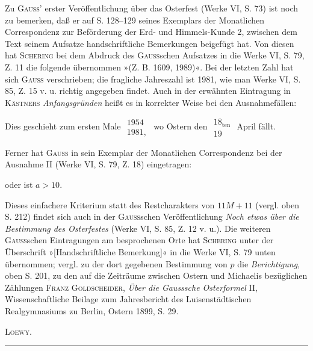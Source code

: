 Zu \textsc{Gauss}' erster Veröffentlichung über das Osterfest (Werke VI, S. 73) ist noch zu bemerken, daß er auf S. 128--129 seines Exemplars der Monatlichen Correspondenz zur Beförderung der Erd- und Himmels-Kunde 2, zwischen dem Text seinem Aufsatze handschriftliche Bemerkungen beigefügt hat. Von diesen hat \textsc{Schering} bei dem Abdruck des \textsc{Gauss}schen Aufsatzes in die Werke VI, S. 79, Z. 11 die folgende übernommen »(Z. B. 1609, 1989)«. Bei der letzten Zahl hat sich \textsc{Gauss} verschrieben; die fragliche Jahreszahl ist 1981, wie man Werke VI, S. 85, Z. 15 v. u. richtig angegeben findet. Auch in der erwähnten Eintragung in \textsc{Kästners} \textit{Anfangsgründen} heißt es in korrekter Weise bei den Ausnahmefällen:
\begin{center}\normalsize
Dies geschieht zum ersten Male $\begin{array}{r}1954\\1981,\end{array}$ wo Ostern den $\begin{array}{c}18_{\mathrm{ten}}\\19\end{array}$ April fällt.
\end{center}
\noindent\hspace*{\parindent}Ferner hat \textsc{Gauss} in sein Exemplar der Monatlichen Correspondenz bei der Ausnahme II (Werke VI, S. 79, Z. 18) eingetragen:
\begin{center}\normalsize
oder ist $a>10$.
\end{center}
\noindent Dieses einfachere Kriterium statt des Restcharakters von $11M+11$ (vergl. oben S. 212) findet sich auch in der \textsc{Gauss}schen Veröffentlichung \textit{Noch etwas über die Bestimmung des Osterfestes} (Werke VI, S. 85, Z. 12 v. u.). Die weiteren \textsc{Gauss}schen Eintragungen am besprochenen Orte hat \textsc{Schering} unter der Überschrift »[Handschriftliche Bemerkung]« in die Werke VI, S. 79 unten übernommen; vergl. zu der dort gegebenen Bestimmung von $p$ die \textit{Berichtigung}, oben S. 201, zu den auf die Zeiträume zwischen Ostern und Michaelis bezüglichen Zählungen \textsc{Franz Goldscheider}, \textit{Über die Gausssche Osterformel} II, Wissenschaftliche Beilage zum Jahresbericht des Luisenstädtischen Realgymnasiums zu Berlin, Ostern 1899, S. 29.
\begin{flushright}\textsc{Loewy.}\end{flushright}
{\normalsize \begin{center}\rule{0.25\textwidth}{0.4pt}\end{center}}
\clearpage\endgroup\endgroup
